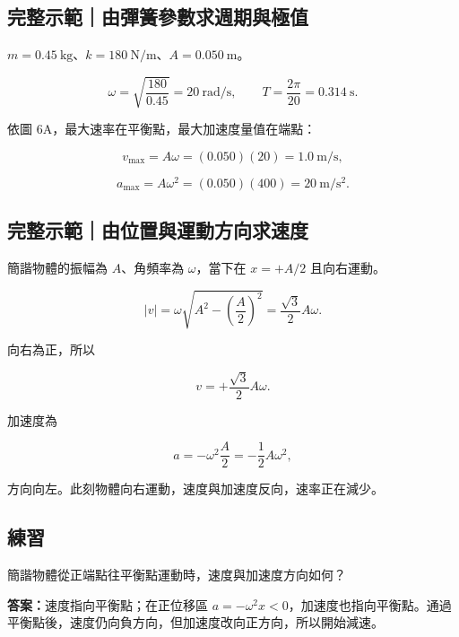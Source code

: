 \documentclass[11pt,a4paper]{article}
\begin{document}
\begin{HandoutWorkedExample}

\subsection{完整示範｜由彈簧參數求週期與極值}\label{ux5b8cux6574ux793aux7bc4ux7531ux5f48ux7c27ux53c3ux6578ux6c42ux9031ux671fux8207ux6975ux503c}

\(m=0.45\ \mathrm{kg}\)、\(k=180\ \mathrm{N/m}\)、\(A=0.050\ \mathrm m\)。

\[
\omega=\sqrt{\frac{180}{0.45}}=20\ \mathrm{rad/s},
\qquad
T=\frac{2\pi}{20}=0.314\ \mathrm s.
\]

依圖 6A，最大速率在平衡點，最大加速度量值在端點：

\[
v_{\max}=A\omega=(0.050)(20)=1.0\ \mathrm{m/s},
\]

\[
a_{\max}=A\omega^2=(0.050)(400)=20\ \mathrm{m/s^2}.
\]

\end{HandoutWorkedExample}

\begin{HandoutWorkedExample}

\subsection{完整示範｜由位置與運動方向求速度}\label{ux5b8cux6574ux793aux7bc4ux7531ux4f4dux7f6eux8207ux904bux52d5ux65b9ux5411ux6c42ux901fux5ea6}

簡諧物體的振幅為 \(A\)、角頻率為 \(\omega\)，當下在 \(x=+A/2\) 且向右運動。

\[
|v|=\omega\sqrt{A^2-\left(\frac A2\right)^2}
=\frac{\sqrt3}{2}A\omega.
\]

向右為正，所以

\[
v=+\frac{\sqrt3}{2}A\omega.
\]

加速度為

\[
a=-\omega^2\frac A2=-\frac12A\omega^2,
\]

方向向左。此刻物體向右運動，速度與加速度反向，速率正在減少。

\end{HandoutWorkedExample}

\begin{HandoutSelfCheck}

\subsection{練習}\label{ux7df4ux7fd2-6}

簡諧物體從正端點往平衡點運動時，速度與加速度方向如何？

\textbf{答案：}速度指向平衡點；在正位移區 \(a=-\omega^2x<0\)，加速度也指向平衡點。通過平衡點後，速度仍向負方向，但加速度改向正方向，所以開始減速。

\end{HandoutSelfCheck}
\end{document}
